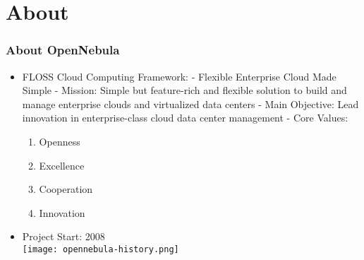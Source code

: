 \section{About}

\begin{frame}[allowframebreaks]
\frametitle{About OpenNebula}

\begin{itemize}
	\item FLOSS Cloud Computing Framework:\linebreak
	- Flexible Enterprise Cloud Made Simple\linebreak
	- Mission: Simple but feature-rich and flexible solution to build and manage enterprise clouds and virtualized data centers\linebreak
 - Main Objective: Lead innovation in enterprise-class cloud data center management\linebreak
 - Core Values: 
   \begin{enumerate}\itemsep0pt
   \item{Openness}
   \item{Excellence}
   \item{Cooperation}
   \item{Innovation}
   \end{enumerate}
	\item Project Start: 2008\\
 \texttt{[image: opennebula-history.png]}
\end{itemize}

\end{frame}
